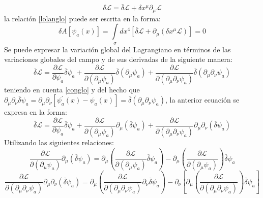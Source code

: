 \documentclass[a4paper,12pt]{article}
\begin{document}
\begin{equation}
\delta \mathscr{L}=\overset{\_}{\delta}\mathscr{L}+\delta x^{\mu}\partial_\mu\mathscr{L}
\end{equation}
la relación \eqref{lolanglo} puede ser escrita en la forma:
\begin{equation}
\delta A[\psi_a (x)]=\int\limits_{\sigma}dx^{4}[\overset{\_}{\delta}\mathscr{L}+\partial_{\mu}(\delta x^{\mu}\mathscr{L})]=0         
\label{actra}
\end{equation}
Se puede expresar la variación global del Lagrangiano en términos de las variaciones globales del campo y de sus derivadas de la siguiente manera: 
\begin{equation}
\overset{\_}{\delta}\mathscr{L}=\frac{\partial\mathscr{L} }{\partial \psi_a}\overset{\_}{\delta}\psi_a +\frac{\partial\mathscr{L} }{\partial(\partial_{\mu} \psi_a)}\overset{\_}{\delta}(\partial_{\mu} \psi_a)+\frac{\partial\mathscr{L} }{\partial(\partial_{\mu}\partial_{\nu} \psi_a)}\overset{\_}{\delta}(\partial_{\mu}\partial_{\nu} \psi_a)
\label{varlaglo} 
\end{equation}
teniendo en cuenta \eqref{conglo} y del hecho que $\partial_{\mu}\partial_{\nu} \overset{\_}{\delta}\psi_a=\partial_{\mu}\partial_{\nu}[\psi_a^{'}(x)-\psi_a(x)]=\overset{\_}{\delta}(\partial_{\mu}\partial_{\nu} \psi_a)$, la anterior ecuación se expresa en la forma: 
\begin{equation}
\overset{\_}{\delta}\mathscr{L}=\frac{\partial\mathscr{L} }{\partial \psi_a}\overset{\_}{\delta}\psi_a +\frac{\partial\mathscr{L} }{\partial(\partial_{\mu} \psi_a)}\partial_{\mu}(\overset{\_}{\delta} \psi_a)+\frac{\partial\mathscr{L} }{\partial(\partial_{\mu}\partial_{\nu} \psi_a)}\partial_{\mu}\partial_{\nu}(\overset{\_}{\delta} \psi_a)  
\label{varlas}
\end{equation}
Utilizando las siguientes relaciones:
\begin{equation}
\frac{\partial\mathscr{L} }{\partial(\partial_{\mu} \psi_a)}\partial_{\mu}(\overset{\_}{\delta} \psi_a)=\partial_{\mu}\left(\frac{\partial\mathscr{L} }{\partial(\partial_{\mu} \psi_a)}\overset{\_}{\delta} \psi_a\right)-\partial_{\mu}\left(\frac{\partial\mathscr{L} }{\partial(\partial_{\mu} \psi_a)}\right)\overset{\_}{\delta} \psi_a 
\end{equation}
$$
\frac{\partial\mathscr{L} }{\partial(\partial_{\mu}\partial_{\nu} \psi_a)}\partial_{\mu}\partial_{\nu}(\overset{\_}{\delta} \psi_a)=\partial_{\mu}\left(\frac{\partial\mathscr{L} }{\partial(\partial_{\mu}\partial_{\nu} \psi_a)}\partial_{\nu}\overset{\_}{\delta} \psi_a\right)-\partial_{\nu}\left[\partial_{\mu}\left(\frac{\partial\mathscr{L} }{\partial(\partial_{\mu}\partial_{\nu} \psi_a)}\right)\overset{\_}{\delta} \psi_a\right] 
$$
\end{document}
